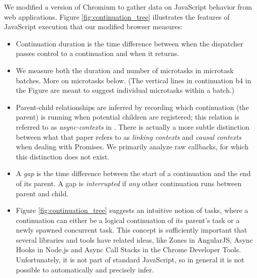 \documentclass[acmsmall,anonymous,review]{acmart}\settopmatter{printfolios=true,printccs=false,printacmref=false}
\begin{document}
We modified a version of Chromium to gather data on JavaScript behavior from web applications.
Figure \ref{fig:continuation_tree} illustrates the features of JavaScript execution that our modified browser measures:

\begin{itemize}
\item Continuation duration is the time difference between when the dispatcher passes control to a continuation and when it returns.
\item We measure both the duration and number of microtasks in microtask batches.
  More on microtasks below.
  (The vertical lines in continuation \textsf{b4} in the Figure are meant to suggest individual microtasks within a batch.)
\item Parent-child relationships are inferred by recording which continuation (the parent) is running when potential children are registered; this relation is referred to as \emph{async-contexts} in \cite{Loring2017}.
  There is actually a more subtle distinction between what that paper refers to as \emph{linking contexts} and \emph{causal contexts} when dealing with Promises.
  We primarily analyze raw callbacks, for which this distinction does not exist.
\item A \emph{gap} is the time difference between the start of a continuation and the end of its parent.
  A gap is \emph{interrupted} if \emph{any} other continuation runs between parent and child.
\item Figure \ref{fig:continuation_tree} suggests an intuitive notion of tasks, where a continuation can either be a logical continuation of its parent's task or a newly spawned concurrent task.
  This concept is sufficiently important that several libraries and tools have related ideas, like Zones in AngularJS, Async Hooks in Node.js and Async Call Stacks in the Chrome Developer Tools.
  Unfortunately, it is not part of standard JavaScript, so in general it is not possible to automatically and precisely infer.
\end{itemize}

\end{document}
